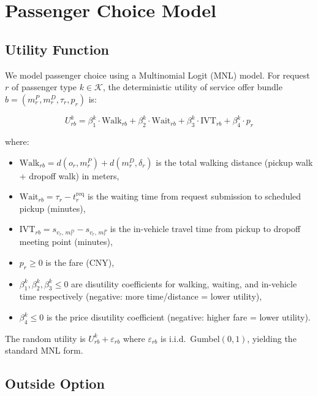 
\section*{Passenger Choice Model}

\subsection*{Utility Function}

We model passenger choice using a Multinomial Logit (MNL) model. For request $r$ of passenger
type $k \in \mathcal{K}$, the deterministic utility of service offer bundle
$b = (m_r^P, m_r^D, \tau_r, p_r)$ is:

\begin{equation}\label{eq:utility}
  U_{rb}^k = \beta_1^k \cdot \text{Walk}_{rb} + \beta_2^k \cdot \text{Wait}_{rb}
           + \beta_3^k \cdot \text{IVT}_{rb} + \beta_4^k \cdot p_r
\end{equation}

where:
\begin{itemize}
  \item $\text{Walk}_{rb} = d(o_r, m_r^P) + d(m_r^D, \delta_r)$ is the total walking distance
        (pickup walk + dropoff walk) in meters,
  \item $\text{Wait}_{rb} = \tau_r - t_r^{\text{req}}$ is the waiting time from request
        submission to scheduled pickup (minutes),
  \item $\text{IVT}_{rb} = s_{v_r,\, m_r^D} - s_{v_r,\, m_r^P}$ is the in-vehicle travel
        time from pickup to dropoff meeting point (minutes),
  \item $p_r \geq 0$ is the fare (CNY),
  \item $\beta_1^k, \beta_2^k, \beta_3^k \leq 0$ are disutility coefficients for walking,
        waiting, and in-vehicle time respectively (negative: more time/distance = lower utility),
  \item $\beta_4^k \leq 0$ is the price disutility coefficient (negative: higher fare = lower
        utility).
\end{itemize}

The random utility is $U_{rb}^k + \varepsilon_{rb}$ where $\varepsilon_{rb}$ is i.i.d.\
Gumbel$(0,1)$, yielding the standard MNL form.

\subsection*{Outside Option}

